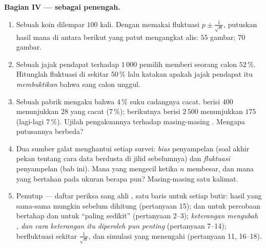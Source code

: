 \begin{problem}
\medskip
\noindent\textbf{Bagian IV ---  sebagai penengah.}
\begin{enumerate}[resume]
  \item Sebuah koin dilempar $100$ kali. Dengan memakai 
        fluktuasi $p \pm \frac{1}{\sqrt n}$, putuskan hasil mana di antara
        berikut yang patut mengangkat alis: $55$ gambar; $70$
        gambar.
  \item Sebuah jajak pendapat terhadap $1\,000$ pemilih memberi seorang
        calon $52\,\%$. Hitunglah  fluktuasi di sekitar $50\,\%$ lalu
        katakan apakah jajak pendapat itu \emph{membuktikan} bahwa sang calon
        unggul.
  \item Sebuah pabrik mengaku bahwa $4\,\%$ suku cadangnya cacat. 
        berisi $400$ menunjukkan $28$ yang cacat ($7\,\%$);  berikutnya
        berisi $2\,500$ menunjukkan $175$ (lagi-lagi $7\,\%$). Ujilah
        pengakuannya terhadap masing-masing . Mengapa putusannya berbeda?
  \item Dua sumber galat menghantui setiap survei: \emph{bias}
        penyampelan (soal akhir pekan tentang cara data berdusta di jilid
        sebelumnya) dan \emph{fluktuasi} penyampelan (bab ini). Mana yang
        mengecil ketika $n$ membesar, dan mana yang bertahan pada ukuran
         berapa pun? Masing-masing satu kalimat.
  \item Penutup --- daftar periksa sang ahli , satu baris untuk
        setiap butir: hasil yang sama-sama mungkin sebelum dihitung
        (pertanyaan 15);  dan  untuk percobaan bertahap dan
        untuk ``paling sedikit'' (pertanyaan 2--3); \emph{keterangan
        mengubah , dan cara keterangan itu diperoleh pun penting}
        (pertanyaan 7--14);  berfluktuasi sekitar
        $\frac{1}{\sqrt n}$, dan simulasi yang menengahi
        (pertanyaan 11, 16--18).

\end{enumerate}
\end{problem}
